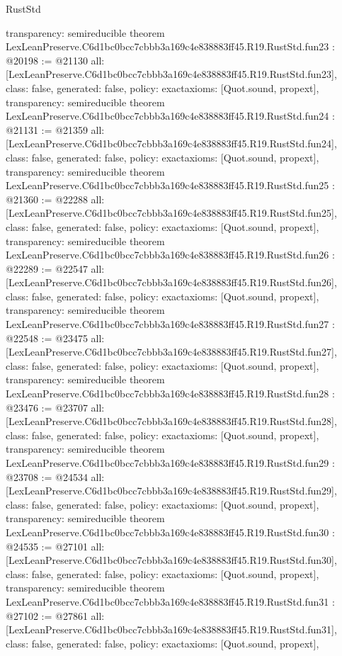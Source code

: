 \begin{lexlean}{RustStd}
\begin{coremodule}
{  transparency: semireducible
}
theorem LexLeanPreserve.C6d1bc0bcc7cbbb3a169c4e838883ff45.R19.RustStd.fun23 : @20198 := @21130 {
  all: [LexLeanPreserve.C6d1bc0bcc7cbbb3a169c4e838883ff45.R19.RustStd.fun23],
  class: false,
  generated: false,
  policy: exact{axioms: [Quot.sound, propext]},
  transparency: semireducible
}
theorem LexLeanPreserve.C6d1bc0bcc7cbbb3a169c4e838883ff45.R19.RustStd.fun24 : @21131 := @21359 {
  all: [LexLeanPreserve.C6d1bc0bcc7cbbb3a169c4e838883ff45.R19.RustStd.fun24],
  class: false,
  generated: false,
  policy: exact{axioms: [Quot.sound, propext]},
  transparency: semireducible
}
theorem LexLeanPreserve.C6d1bc0bcc7cbbb3a169c4e838883ff45.R19.RustStd.fun25 : @21360 := @22288 {
  all: [LexLeanPreserve.C6d1bc0bcc7cbbb3a169c4e838883ff45.R19.RustStd.fun25],
  class: false,
  generated: false,
  policy: exact{axioms: [Quot.sound, propext]},
  transparency: semireducible
}
theorem LexLeanPreserve.C6d1bc0bcc7cbbb3a169c4e838883ff45.R19.RustStd.fun26 : @22289 := @22547 {
  all: [LexLeanPreserve.C6d1bc0bcc7cbbb3a169c4e838883ff45.R19.RustStd.fun26],
  class: false,
  generated: false,
  policy: exact{axioms: [Quot.sound, propext]},
  transparency: semireducible
}
theorem LexLeanPreserve.C6d1bc0bcc7cbbb3a169c4e838883ff45.R19.RustStd.fun27 : @22548 := @23475 {
  all: [LexLeanPreserve.C6d1bc0bcc7cbbb3a169c4e838883ff45.R19.RustStd.fun27],
  class: false,
  generated: false,
  policy: exact{axioms: [Quot.sound, propext]},
  transparency: semireducible
}
theorem LexLeanPreserve.C6d1bc0bcc7cbbb3a169c4e838883ff45.R19.RustStd.fun28 : @23476 := @23707 {
  all: [LexLeanPreserve.C6d1bc0bcc7cbbb3a169c4e838883ff45.R19.RustStd.fun28],
  class: false,
  generated: false,
  policy: exact{axioms: [Quot.sound, propext]},
  transparency: semireducible
}
theorem LexLeanPreserve.C6d1bc0bcc7cbbb3a169c4e838883ff45.R19.RustStd.fun29 : @23708 := @24534 {
  all: [LexLeanPreserve.C6d1bc0bcc7cbbb3a169c4e838883ff45.R19.RustStd.fun29],
  class: false,
  generated: false,
  policy: exact{axioms: [Quot.sound, propext]},
  transparency: semireducible
}
theorem LexLeanPreserve.C6d1bc0bcc7cbbb3a169c4e838883ff45.R19.RustStd.fun30 : @24535 := @27101 {
  all: [LexLeanPreserve.C6d1bc0bcc7cbbb3a169c4e838883ff45.R19.RustStd.fun30],
  class: false,
  generated: false,
  policy: exact{axioms: [Quot.sound, propext]},
  transparency: semireducible
}
theorem LexLeanPreserve.C6d1bc0bcc7cbbb3a169c4e838883ff45.R19.RustStd.fun31 : @27102 := @27861 {
  all: [LexLeanPreserve.C6d1bc0bcc7cbbb3a169c4e838883ff45.R19.RustStd.fun31],
  class: false,
  generated: false,
  policy: exact{axioms: [Quot.sound, propext]},
}
\end{coremodule}
\end{lexlean}
